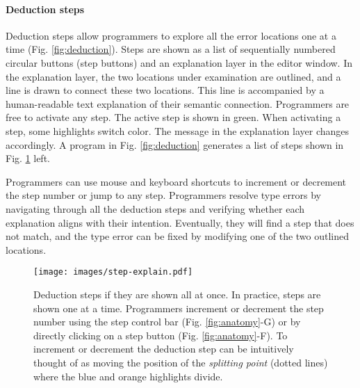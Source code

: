 \paragraph{Deduction steps}  \label{sub:deduction-steps}



Deduction steps allow programmers to explore all the error locations one at a time (Fig. \ref{fig:deduction}). Steps are shown as a list of sequentially  numbered circular buttons (step buttons) and an explanation layer in the editor window. In the explanation layer, the two locations under examination are outlined, and a line is drawn to connect these two locations. This line is accompanied by a human-readable text explanation of their semantic connection. Programmers are free to activate any step. The active step is shown in green. When activating a step, some highlights switch color. The message in the explanation layer changes accordingly. A program in Fig. \ref{fig:deduction} generates a list of steps shown in Fig. \ref{fig:step-interface} left.


Programmers can use mouse and keyboard shortcuts to increment or decrement the step number or jump to any step. Programmers resolve type errors by navigating through all the deduction steps and verifying whether each explanation aligns with their intention. Eventually, they will find a step that does not match, and the type error can be fixed by modifying one of the two outlined locations.

\begin{figure}[ht]
    \centering
    \texttt{[image: images/step-explain.pdf]}
    \caption[Deduction steps if they are shown all at once]{
Deduction steps if they are shown all at once. In practice, steps are shown one at a time. Programmers increment or decrement the step number using the step control bar (Fig. \ref{fig:anatomy}-G) or by directly clicking on a step button (Fig. \ref{fig:anatomy}-F). To increment or decrement the deduction step can be intuitively thought of as moving the position of the \textit{splitting point} (dotted lines) where the blue and orange highlights divide.
        }
    \label{fig:step-interface}
\end{figure}

